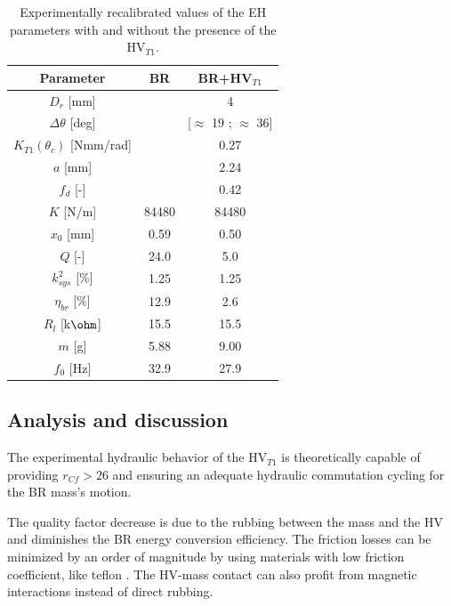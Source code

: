 \documentclass[3p,twocolumn,preprint]{elsarticle}
\begin{document}
\begin{table}[!htbp]
	\centering
		\begin{tabular}[t]{c|c|c}
\toprule
\multicolumn{1}{c}{\textbf{Parameter}}	&
\multicolumn{1}{c}{\textbf{BR}} 	& 
\multicolumn{1}{c}{\textbf{BR+HV$_{T1}$}}  \\
\midrule
$D_r$ [mm] 						& \cellcolor{ashgrey} 		& {4} 		\\ \hline
$\Delta\theta$ [deg] 			& \cellcolor{ashgrey} 		& {{[$\approx$ 19 ; $\approx$ 36]}} \\ \hline
$K_{T1}(\theta_c)$ [Nmm/rad]	& \cellcolor{ashgrey}  		&  0.27 		\\ \hline
$a$ [mm]         			    & \cellcolor{ashgrey}  		&  2.24		\\ \hline
$f_d$ [-] 						& \cellcolor{ashgrey}  		&  0.42  		\\ \hline
$K$ [N/m] 						&	84480			  	 	&  84480  			\\ \hline
$x_0$ [mm] 						& {0.59}					& {0.50}  	\\ \hline
$Q$	[-] 						& 		24.0		 		& 5.0     					\\ \hline
$k^2_{sys}$ [\%] 				& 		1.25		 		& {1.25}   	\\ \hline
$\eta_{br}$ [\%] 				& 		12.9		 		& 2.6   \\ \hline	
$R_l$ [k$\text{\ohm}$] 			&	{15.5}					& {15.5}   	\\ \hline		
$m$	[g]						    &	{5.88}					& 9.00   		\\ \hline	
$f_0$ [Hz]						&		32.9				& 27.9   					\\
\bottomrule	
	\end{tabular}
        \caption{Experimentally recalibrated values of the EH parameters with and without the presence of the HV$_{T1}$.}
        \label{tab:parametres lacher tube}
\end{table}        
	\subsection{Analysis and discussion}
The experimental hydraulic behavior of the HV$_{T1}$ is theoretically capable of providing \mbox{$r_{Cf}>26$} and ensuring an adequate hydraulic commutation cycling for the BR mass's motion.

The quality factor decrease is due to the rubbing between the mass and the HV and diminishes the BR energy conversion efficiency. The friction losses can be minimized by an order of magnitude by using materials with low friction coefficient, like teflon \cite{Nosonovsky2013}. The HV-mass contact can also profit from magnetic interactions instead of direct rubbing.
\end{document}
